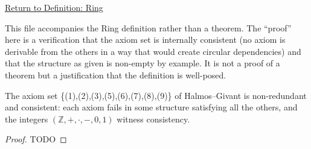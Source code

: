 \newpage
{}
\label{prf:ring-axioms-well-defined}

\begin{remark*}[Return]
\hyperref[def:ring]{Return to Definition: Ring}
\end{remark*}

\begin{remark*}
This file accompanies the Ring definition rather than a theorem. The
``proof'' here is a verification that the axiom set is internally
consistent (no axiom is derivable from the others in a way that
would create circular dependencies) and that the structure as given
is non-empty by example. It is not a proof of a theorem but a
justification that the definition is well-posed.
\end{remark*}

\begin{proposition*}
The axiom set \{(1),(2),(3),(5),(6),(7),(8),(9)\} of Halmos--Givant is
non-redundant and consistent: each axiom fails in some structure
satisfying all the others, and the integers $(\mathbb{Z},+,\cdot,-,0,1)$
witness consistency.
\end{proposition*}

\begin{proof}
TODO
\end{proof}
